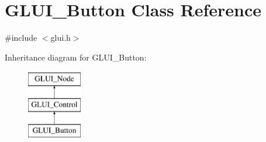 \hypertarget{classGLUI__Button}{\section{G\-L\-U\-I\-\_\-\-Button Class Reference}
\label{classGLUI__Button}
}


{\ttfamily \#include $<$glui.\-h$>$}

Inheritance diagram for G\-L\-U\-I\-\_\-\-Button\-:\begin{figure}[H]
\begin{center}
\leavevmode
\includegraphics[height=3.000000cm]{classGLUI__Button}
\end{center}
\end{figure}
